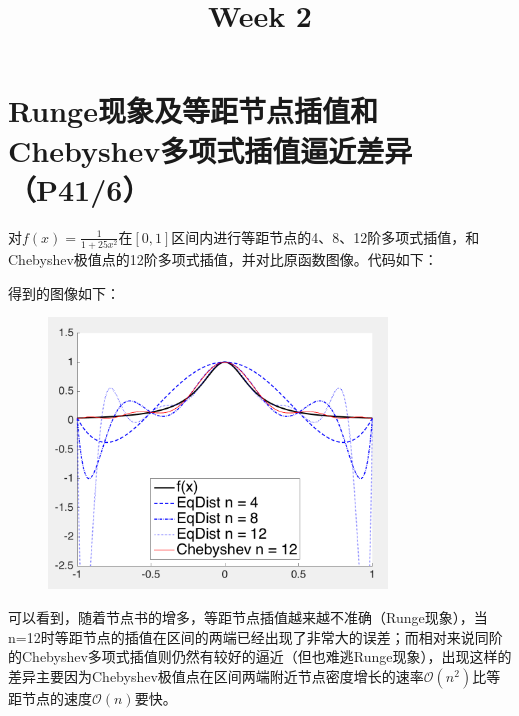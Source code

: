 \documentclass{homework}
\title{Week 2}
\date{}
\begin{document}
\maketitle
\section{Runge现象及等距节点插值和Chebyshev多项式插值逼近差异（P41/6）}
对$f(x)=\frac{1}{1+25x^2}$在$[0,1]$区间内进行等距节点的4、8、12阶多项式插值，和Chebyshev极值点的12阶多项式插值，并对比原函数图像。代码如下：

得到的图像如下：
\begin{figure}[H]
\includegraphics[width=9cm]{Runge.png}
\centering
\end{figure}
可以看到，随着节点书的增多，等距节点插值越来越不准确（Runge现象），当n=12时等距节点的插值在区间的两端已经出现了非常大的误差；而相对来说同阶的Chebyshev多项式插值则仍然有较好的逼近（但也难逃Runge现象），出现这样的差异主要因为Chebyshev极值点在区间两端附近节点密度增长的速率$\mathcal{O}(n^2)$比等距节点的速度$\mathcal{O}(n)$要快。
\end{document}

